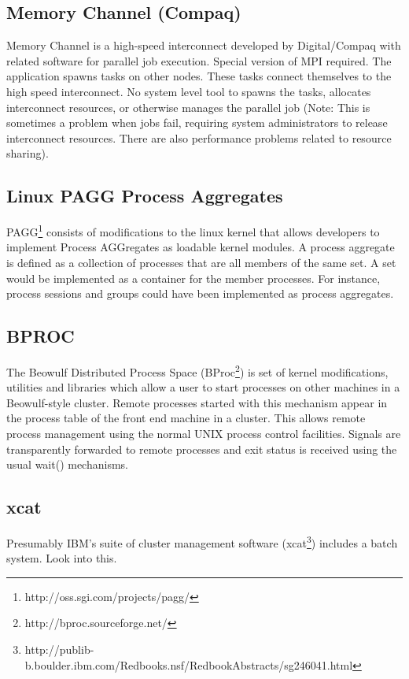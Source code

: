 \subsection{Memory Channel (Compaq)}

Memory Channel is a high-speed interconnect developed by 
Digital/Compaq with related software for parallel job execution. 
Special version of MPI required. The application spawns tasks on 
other nodes. These tasks connect themselves to the high speed 
interconnect. No system level tool to spawns the tasks, allocates 
interconnect resources, or otherwise manages the parallel job (Note: 
This is sometimes a problem when jobs fail, requiring system 
administrators to release interconnect resources. There are also 
performance problems related to resource sharing).

\subsection{Linux PAGG Process Aggregates}


PAGG\footnote{http://oss.sgi.com/projects/pagg/}
consists of modifications to the linux kernel that allows
developers to implement Process AGGregates as loadable kernel modules.
A process aggregate is defined as a collection of processes that are
all members of the same set. A set would be implemented as a container
for the member processes. For instance, process sessions and groups
could have been implemented as process aggregates.

\subsection{BPROC}


The Beowulf Distributed Process Space 
(BProc\footnote{http://bproc.sourceforge.net/})
is set of kernel
modifications, utilities and libraries which allow a user to start
processes on other machines in a Beowulf-style cluster.  Remote
processes started with this mechanism appear in the process table
of the front end machine in a cluster. This allows remote process
management using the normal UNIX process control facilities. Signals
are transparently forwarded to remote processes and exit status is
received using the usual wait() mechanisms.

\subsection{xcat}

Presumably IBM's suite of cluster management software 
(xcat\footnote{http://publib-b.boulder.ibm.com/Redbooks.nsf/RedbookAbstracts/sg246041.html})
includes a batch system.  Look into this.

